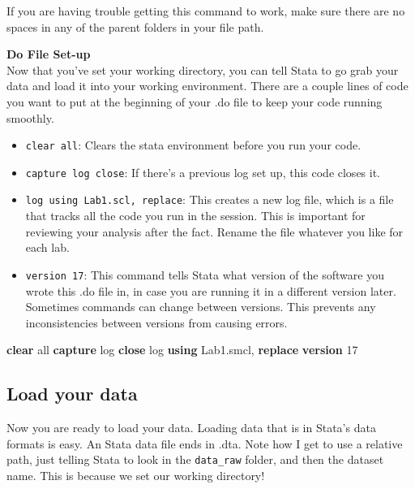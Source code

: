 \documentclass[
]{book}
\newenvironment{Shaded}{\begin{snugshade}}{\end{snugshade}}
\newcommand{\FunctionTok}[1]{\textcolor[rgb]{0.00,0.00,0.00}{#1}}
\newcommand{\KeywordTok}[1]{\textcolor[rgb]{0.13,0.29,0.53}{\textbf{#1}}}
\newcommand{\NormalTok}[1]{#1}
\newcommand{\OtherTok}[1]{\textcolor[rgb]{0.56,0.35,0.01}{#1}}
\providecommand{\tightlist}{%
  \setlength{\itemsep}{0pt}\setlength{\parskip}{0pt}}
\begin{document}
If you are having trouble getting this command to work, make sure there are no spaces in any of the parent folders in your file path.

\textbf{Do File Set-up}\\
Now that you've set your working directory, you can tell Stata to go grab your data and load it into your working environment.
There are a couple lines of code you want to put at the beginning of your .do file to keep your code running smoothly.

\begin{itemize}
\tightlist
\item
  \texttt{clear\ all}: Clears the stata environment before you run your code.
\item
  \texttt{capture\ log\ close}: If there's a previous log set up, this code closes it.
\item
  \texttt{log\ using\ Lab1.scl,\ replace}: This creates a new log file, which is a file that tracks all the code you run in the session. This is important for reviewing your analysis after the fact. Rename the file whatever you like for each lab.
\item
  \texttt{version\ 17}: This command tells Stata what version of the software you wrote this .do file in, in case you are running it in a different version later. Sometimes commands can change between versions. This prevents any inconsistencies between versions from causing errors.
\end{itemize}

\begin{Shaded}
\begin{Highlighting}[]
\KeywordTok{clear} \OtherTok{all} 
\KeywordTok{capture} \FunctionTok{log} \KeywordTok{close}
\FunctionTok{log} \KeywordTok{using}\NormalTok{ Lab1.smcl, }\KeywordTok{replace}
\KeywordTok{version}\NormalTok{ 17}
\end{Highlighting}
\end{Shaded}

\hypertarget{use}{%
\subsection*{Load your data}\label{use}}

Now you are ready to load your data. Loading data that is in Stata's data formats is easy. An Stata data file ends in .dta. Note how I get to use a relative path, just telling Stata to look in the \texttt{data\_raw} folder, and then the dataset name. This is because we set our working directory!
\end{document}
